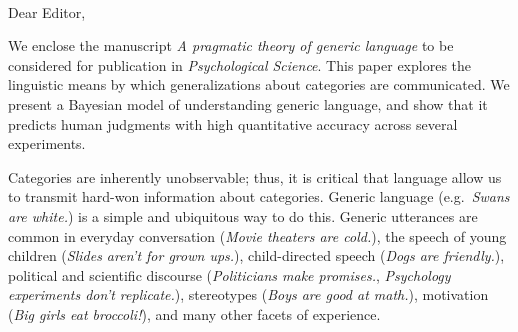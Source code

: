 \documentclass[11pt,letterpaper]{letter} %
\def\opening#1{\thispagestyle{empty}
{\centering\fromaddress \vspace{0.6in} \\ %
\hspace*{\longindentation}\hspace*{\fill}\par} %
\vspace{0.4in} %
\noindent #1 %
}
\begin{document}

\begin{letter}






\opening{Dear Editor,}


We enclose the manuscript \emph{A pragmatic theory of generic language} to be considered for publication in \emph{Psychological Science}. 
This paper explores the linguistic means by which generalizations about categories are communicated.  
We present a Bayesian model of understanding generic language, and show that it predicts human judgments with high quantitative accuracy across several experiments.


Categories are inherently unobservable; thus, it is critical that language allow us to transmit hard-won information about categories. Generic language (e.g.~\emph{Swans are white.}) is a simple and ubiquitous way to do this. 
Generic utterances are common in everyday conversation (\emph{Movie theaters are cold.}), the speech of young children (\emph{Slides aren't for grown ups.}), child-directed speech (\emph{Dogs are friendly.}), political and scientific discourse (\emph{Politicians make promises.}, \emph{Psychology experiments don't replicate.}), stereotypes (\emph{Boys are good at math.}), motivation (\emph{Big girls eat broccoli!}), and many other facets of experience.


\end{letter}
\end{document}
